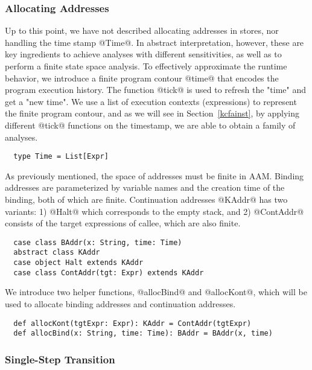 \documentclass[acmsmall, review]{acmart}\settopmatter{}
\begin{document}
\subsubsection{Allocating Addresses}
Up to this point, we have not described allocating addresses in stores,
nor handling the time stamp @Time@.
In abstract interpretation, however, these are key ingredients to achieve
analyses with different sensitivities, as well as to perform a finite
state space analysis\cite{Gilray:2016:ACP:2951913.2951936}.
To effectively approximate the runtime behavior, we introduce a finite
program contour @time@ that encodes the program execution history.
The function @tick@ is used to refresh the "time" and get a "new time".
We use a list of execution contexts (expressions) to represent the finite 
program contour, and as we will see in Section~\ref{kcfainst}, by applying 
different @tick@ functions on the timestamp, we are able to obtain a 
family of analyses.

\begin{lstlisting}
  type Time = List[Expr]
\end{lstlisting}

As previously mentioned, the space of addresses must be finite in AAM.
Binding addresses are parameterized by variable names and the creation 
time of the binding, both of which are finite.
Continuation addresses @KAddr@ has two variants:
1) @Halt@ which corresponds to the empty stack, and
2) @ContAddr@ consists of the target expressions of callee, which are also
finite.

\begin{lstlisting}
  case class BAddr(x: String, time: Time) 
  abstract class KAddr
  case object Halt extends KAddr
  case class ContAddr(tgt: Expr) extends KAddr
\end{lstlisting}

We introduce two helper functions, @allocBind@ and @allocKont@, which will be
used to allocate binding addresses and continuation addresses.

\begin{lstlisting}
  def allocKont(tgtExpr: Expr): KAddr = ContAddr(tgtExpr)
  def allocBind(x: String, time: Time): BAddr = BAddr(x, time)
\end{lstlisting}

\subsubsection{Single-Step Transition}
\end{document}
